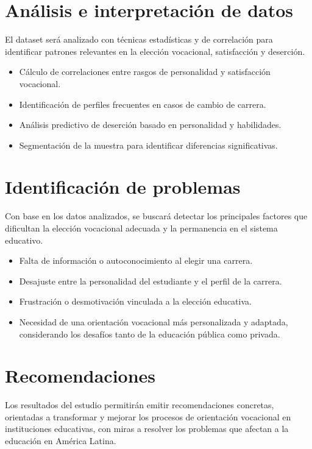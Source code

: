 \section{Análisis e interpretación de datos}

El dataset será analizado con técnicas estadísticas y de correlación para identificar patrones relevantes en la elección vocacional, satisfacción y deserción.

\begin{itemize}
    \item Cálculo de correlaciones entre rasgos de personalidad y satisfacción vocacional.
    \item Identificación de perfiles frecuentes en casos de cambio de carrera.
    \item Análisis predictivo de deserción basado en personalidad y habilidades.
    \item Segmentación de la muestra para identificar diferencias significativas.
\end{itemize}

\section{Identificación de problemas}

Con base en los datos analizados, se buscará detectar los principales factores que dificultan la elección vocacional adecuada y la permanencia en el sistema educativo.

\begin{itemize}
    \item Falta de información o autoconocimiento al elegir una carrera.
    \item Desajuste entre la personalidad del estudiante y el perfil de la carrera.
    \item Frustración o desmotivación vinculada a la elección educativa.
    \item Necesidad de una orientación vocacional más personalizada y adaptada, considerando los desafíos tanto de la educación pública como privada.
\end{itemize}

\section{Recomendaciones}

Los resultados del estudio permitirán emitir recomendaciones concretas, orientadas a transformar y mejorar los procesos de orientación vocacional en instituciones educativas, con miras a resolver los problemas que afectan a la educación en América Latina.

